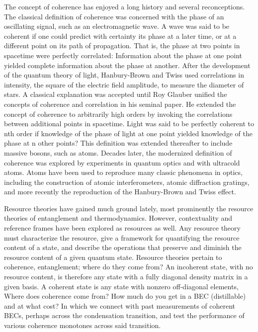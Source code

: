 	The concept of coherence has enjoyed a long history and several reconceptions.
	The classical definition of coherence was concerned with the phase of an oscillating signal, such as an electromagnetic wave.
	A wave was said to be coherent if one could predict with certainty its phase at a later time, or at a different point on its path of propagation.
	That is, the phase at two points in spacetime were perfectly correlated: Information about the phase at one point yielded complete information about the phase at another.
	After the development of the quantum theory of light, Hanbury-Brown and Twiss used correlations in intensity, the square of the electric field amplitude, to measure the diameter of stars.
	A classical explanation was accepted until Roy Glauber unified the concepts of coherence and correlation in his seminal paper.
	He extended the concept of coherence to arbitrarily high orders by invoking the correlations between additional points in spacetime.
	Light was said to be perfectly coherent to nth order if knowledge of the phase of light at one point yielded knowledge of the phase at n other points? This definition was extended thereafter to include massive bosons, such as atoms.
	Decades later, the modernized definition of coherence was explored by experiments in quantum optics and with ultracold atoms.
	Atoms have been used to reproduce many classic phenomena in optics, including the construction of atomic interferometers, atomic diffraction gratings, and more recently the reproduction of the Hanbury-Brown and Twiss effect.
	

	Resource theories have gained much ground lately, most prominently the resource theories of entanglement and thermodynamics.
	However, contextuality and reference frames have been explored as resources as well.
	Any resource theory must characterize the resource, give a framework for quantifying the resource content of a state, and describe the operations that preserve and diminish the resource content of a given quantum state.
	Resource theories pertain to coherence, entanglement; where do they come from? An incoherent state, with no resource content, is therefore any state with a fully diagonal density matrix in a given basis.
	A coherent state is any state with  nonzero off-diagonal elements, Where does coherence come from? How much do you get in a BEC (distillable) and at what cost?	In which we connect with past measurements of coherent BECs, perhaps across the condensation transition, and test the performance of various coherence monotones across said transition.
	


